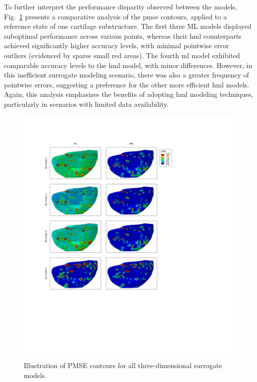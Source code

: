 \documentclass[12pt,a4paper]{report}
\begin{document}
To further interpret the performance disparity observed between the models, Fig.~\ref{fig:visualization} presents a comparative analysis of the \ac{pmse} contours, applied to a reference state of one cartilage substructure. The first three ML models displayed suboptimal performance across various points, whereas their \ac{hml} counterparts achieved significantly higher accuracy levels, with minimal pointwise error outliers (evidenced by sparse small red areas). The fourth \ac{ml} model exhibited comparable accuracy levels to the \ac{hml} model, with minor differences. However, in this inefficient surrogate modeling scenario, there was also a greater frequency of pointwise errors, suggesting a preference for the other more efficient \ac{hml} models. Again, this analysis emphasizes the benefits of adopting \ac{hml} modeling techniques, particularly in scenarios with limited data availability.
%
\begin{figure}\centering
\includegraphics[trim={4.8cm 16.5cm 15cm 5cm},clip,width=1\linewidth,height=0.9\textheight,keepaspectratio]{visualization_3d.pdf}
\caption{Illustration of PMSE contours for all three-dimensional surrogate models.}\label{fig:visualization}
\end{figure}
\end{document}
